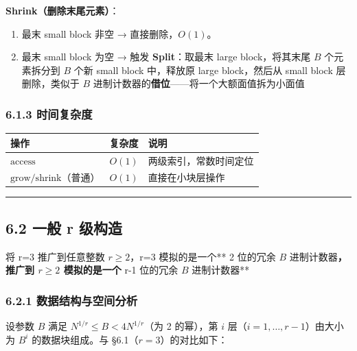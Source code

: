 \documentclass[
  UTF8,
  a4paper,
  12pt]{ctexart}
\newcounter{none} %
\providecommand{\tightlist}{%
  \setlength{\itemsep}{0pt}\setlength{\parskip}{0pt}}
\begin{document}
\textbf{Shrink（删除末尾元素）}：

\begin{enumerate}
\def\labelenumi{\arabic{enumi}.}
\tightlist
\item
  最末 small block 非空 → 直接删除，\(O(1)\)。
\item
  最末 small block 为空 → 触发 \textbf{Split}：取最末 large
  block，将其末尾 \(B\) 个元素拆分到 \(B\) 个新 small block 中，释放原
  large block，然后从 small block 层删除，类似于 \(B\)
  进制计数器的\textbf{借位}------将一个大额面值拆为小面值
\end{enumerate}

\subsubsection{6.1.3 时间复杂度}\label{ux65f6ux95f4ux590dux6742ux5ea6}

{\def\LTcaptype{none} %
\begin{longtable}[]{@{}lll@{}}
\toprule\noalign{}
操作 & 复杂度 & 说明 \\
\midrule\noalign{}
\endhead
\bottomrule\noalign{}
\endlastfoot
\(\text{access}\) & \(O(1)\) & 两级索引，常数时间定位 \\
\(\text{grow}/\text{shrink}\)（普通） & \(O(1)\) & 直接在小块层操作 \\
\end{longtable}
}

\begin{center}\rule{0.5\linewidth}{0.5pt}\end{center}

\subsection{6.2 一般 r 级构造}\label{ux4e00ux822c-r-ux7ea7ux6784ux9020}

将 r=3 推广到任意整数 \(r \ge 2\)，r=3 模拟的是一个** 2 位的冗余 \(B\)
进制计数器\textbf{， 推广到 \(r \ge 2\) 模拟的是一个} r-1 位的冗余 \(B\)
进制计数器**

\subsubsection{6.2.1
数据结构与空间分析}\label{ux6570ux636eux7ed3ux6784ux4e0eux7a7aux95f4ux5206ux6790-1}

设参数 \(B\) 满足 \(N^{1/r} \le B < 4N^{1/r}\)（为 2 的幂），第 \(i\)
层（\(i = 1, \dots, r-1\)）由大小为 \(B^i\) 的数据块组成。与
§6.1（\(r=3\)）的对比如下：
\end{document}
